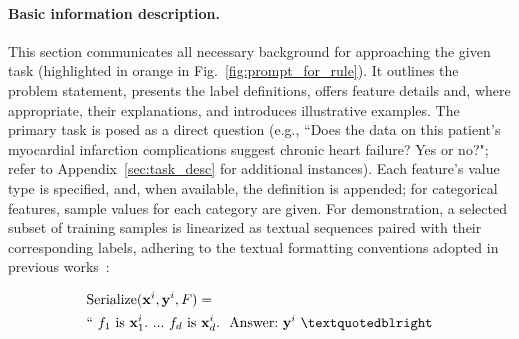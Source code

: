 \vspace*{-0.12in}
\paragraph{Basic information description.} This section communicates all necessary background for approaching the given task (highlighted in orange in Fig.~\ref{fig:prompt_for_rule}). It outlines the problem statement, presents the label definitions, offers feature details and, where appropriate, their explanations, and introduces illustrative examples. The primary task is posed as a direct question (e.g., ``Does the data on this patient's myocardial infarction complications suggest chronic heart failure? Yes or no?"; refer to Appendix~\ref{sec:task_desc} for additional instances). Each feature’s value type is specified, and, when available, the definition is appended; for categorical features, sample values for each category are given. For demonstration, a selected subset of training samples is linearized as textual sequences paired with their corresponding labels, adhering to the textual formatting conventions adopted in previous works~\cite{dinh2022lift,hegselmann2023tabllm}:

\begin{align}
&\text{Serialize}(\mathbf{x}^i,\mathbf{y}^i, F) = \nonumber \\ 
&``\ f_1\ \text{is}\ \mathbf{x}^i_1.\ ... \ f_d\  \text{is}\  \mathbf{x}^i_d.\ \ \text{Answer:}\  \mathbf{y}^i\ ”
\end{align}

\vspace*{-0.12in}
